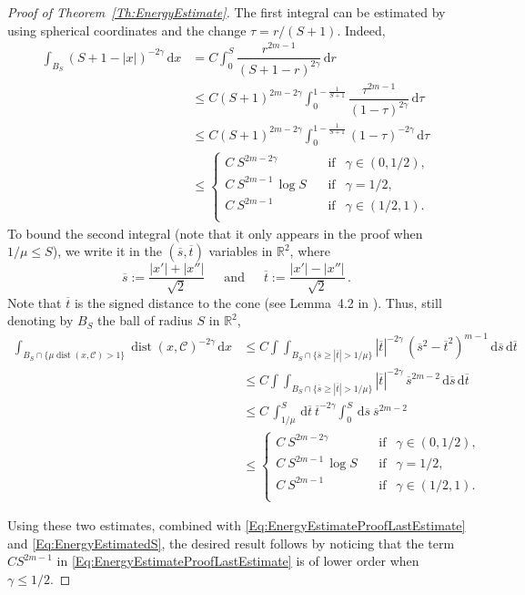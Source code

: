 \documentclass[12pt,reqno]{amsart}
\theoremstyle{definition}
\theoremstyle{remark}
\newcommand{\con}[1]{\mathbb{#1}}
\newcommand{\R}{\con{R}} %
\newcommand{\ccal}{\mathscr{C}}
\newcommand{\s}{\gamma}
\renewcommand{\d}{\,\mathrm{d}} %
\DeclareMathOperator{\dist}{dist}
\numberwithin{equation}{section}
\begin{document}
\begin{proof}[Proof of Theorem~\ref{Th:EnergyEstimate}]
	
	The first integral can be estimated by using spherical coordinates and the change $\tau = r/(S+1)$. Indeed,
	\begin{align*}
	\int_{B_S} \left( S+1-|x| \right)^{-2\s} \d x & = C \int_0^S \dfrac{r^{2m-1}}{(S+1-r)^{2\s}} \d r \\
	& \leq C (S+1)^{2m - 2\s}\int_0^{1 - \frac{1}{S+1}} \dfrac{\tau^{2m-1}}{(1-\tau)^{2\s}} \d \tau\\
	&\leq C (S+1)^{2m - 2\s}\int_0^{1 - \frac{1}{S+1}} (1-\tau)^{-2\s} \d \tau \\
	& \leq \begin{cases}
	C \ S^{2m-2\s}\ \ \ \ &\textrm{if } \ \ \s\in(0,1/2),\\
	C\ S^{2m-1}\,\log S\ \ \ \ &\textrm{if } \ \ \s=1/2,\\
	C \ S^{2m-1}\ \ \ \ &\textrm{if } \ \ \s\in(1/2,1).\\
	\end{cases}
	\end{align*}
	To bound the second integral (note that it only appears in the proof when $1/ \mu \leq S$), we write it in the $(\overline{s},\overline{t})$ variables in $\R^2$, where
	$$
	\overline{s} := \dfrac{|x'|+|x''|}{\sqrt{2}} \, \quad \text{ and } \, \quad  \overline{t} := \dfrac{|x'|-|x''|}{\sqrt{2}}\,.
	$$
	Note that $\overline{t}$ is the signed distance to the cone (see Lemma~4.2 in \cite{CabreTerraI}). Thus, still denoting by $B_S$ the ball of radius $S$ in $\R^2$,
	\begin{align*}
	\int_{B_{S}\cap \{\mu \dist(x,\ccal)>1\}} \dist(x,\ccal)^{-2\s} \d x &\leq C \int \int_{B_{S}\cap \{\overline{s}\geq|\overline{t}|>1/\mu\}} |\overline{t}|^{-2\s} \, (\overline{s}^2-\overline{t}^2)^{m-1} \d \overline{s}\d \overline{t} \\
	& \leq C \int \int_{B_{S}\cap \{\overline{s}\geq|\overline{t}|>1/\mu\}} |\overline{t}|^{-2\s} \, \overline{s}^{2m-2} \d \overline{s}\d \overline{t} \\
	& \leq C\, \int_{1/\mu}^S \d \overline{t}   \ \overline{t}^{-2\s}\int_0^S \d \overline{s}\  \overline{s}^{2m-2} \\
	& \leq \begin{cases}
	C \ S^{2m-2\s}\ \ \ \ &\textrm{if } \ \ \s\in(0,1/2),\\
	C\ S^{2m-1}\,\log S\ \ \ \ &\textrm{if } \ \ \s=1/2,\\
	C \ S^{2m-1}\ \ \ \ &\textrm{if } \ \ \s\in(1/2,1).\\
	\end{cases}
	\end{align*}
	
	Using these two estimates, combined with \eqref{Eq:EnergyEstimateProofLastEstimate} and \eqref{Eq:EnergyEstimatedS},  the desired result follows by noticing that the term $C S^{2m-1}$ in \eqref{Eq:EnergyEstimateProofLastEstimate} is of lower order when $\s \leq 1/2$.
\end{proof}
\end{document}
